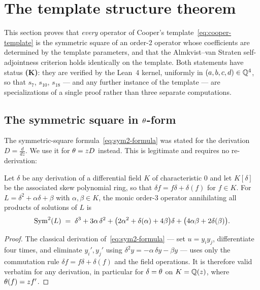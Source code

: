 \section{The template structure theorem}\label{sec:sym2}

This section proves that \emph{every} operator of Cooper's
template~\eqref{eq:cooper-template} is the symmetric square of an order-2
operator whose coefficients are determined by the template parameters, and
that the Almkvist--van Straten self-adjointness criterion holds identically on
the template. Both statements have status \textbf{(K)}: they are verified by
the Lean~4 kernel, uniformly in $(a,b,c,d)\in\mathbb{Q}^4$, so that $s_7$, $s_{10}$,
$s_{18}$ --- and any further instance of the template --- are specializations
of a single proof rather than three separate computations.

\subsection{The symmetric square in \texorpdfstring{$\theta$}{theta}-form}

The symmetric-square formula~\eqref{eq:sym2-formula} was stated for the
derivation $D=\frac{d}{dz}$. We use it for $\theta = zD$ instead. This is
legitimate and requires no re-derivation:

\begin{lemma}\label{lem:theta-sym2}
Let $\delta$ be any derivation of a differential field $K$ of characteristic
$0$ and let $K[\delta]$ be the associated skew polynomial ring, so that
$\delta f = f\delta + \delta(f)$ for $f \in K$. For $L = \delta^2 + \alpha
\delta + \beta$ with $\alpha,\beta \in K$, the monic order-3 operator
annihilating all products of solutions of $L$ is
\begin{equation}\label{eq:sym2-theta}
  \operatorname{Sym}^2(L) \;=\;
  \delta^3 + 3\alpha\,\delta^2
  + \bigl(2\alpha^2 + \delta(\alpha) + 4\beta\bigr)\delta
  + \bigl(4\alpha\beta + 2\delta(\beta)\bigr).
\end{equation}
\end{lemma}

\begin{proof}
The classical derivation of~\eqref{eq:sym2-formula} --- set $u = y_iy_j$,
differentiate four times, and eliminate $y_i',y_j'$ using
$\delta^2 y = -\alpha\,\delta y - \beta y$ --- uses only the commutation rule
$\delta f = f\delta + \delta(f)$ and the field operations. It is therefore
valid verbatim for any derivation, in particular for $\delta = \theta$ on
$K = \mathbb{Q}(z)$, where $\theta(f) = zf'$.
\end{proof}

